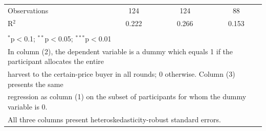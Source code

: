 \begin{table}[!htbp]
\begin{tabular}{@{\extracolsep{5pt}}lccc}
Observations & 124 & 124 & 88 \\ 
R$^{2}$ & 0.222 & 0.266 & 0.153 \\ 
\hline 
\hline \\[-1.8ex] 
\multicolumn{4}{l}{$^{*}$p$<$0.1; $^{**}$p$<$0.05; $^{***}$p$<$0.01} \\ 
\multicolumn{4}{l}{In column (2), the dependent variable is a dummy which equals 1 if the participant allocates the entire} \\ 
\multicolumn{4}{l}{harvest to the certain-price buyer in all rounds; 0 otherwise. Column (3) presents the same} \\ 
\multicolumn{4}{l}{regression as column (1) on the subset of participants for whom the dummy variable is 0.} \\ 
\multicolumn{4}{l}{All three columns present heteroskedasticity-robust standard errors.} \\ 
\end{tabular} 
\end{table} 
